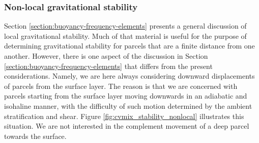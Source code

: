 \subsubsection{Non-local gravitational stability}

Section \ref{section:buoyancy-frequency-elements} presents a general
discussion of local gravitational stability.  Much of that material is
useful for the purpose of determining gravitational stability for
parcels that are a finite distance from one another.  However, there
is one aspect of the discussion in Section
\ref{section:buoyancy-frequency-elements} that differs from the
present considerations.  Namely, we are here always considering
downward displacements of parcels from the surface layer.  The reason
is that we are concerned with parcels starting from the surface layer
moving downwards in an adiabatic and isohaline manner, with the
difficulty of such motion determined by the ambient stratification and
shear.  Figure \ref{fig:cvmix_stability_nonlocal} illustrates this
situation.  We are not interested in the complement movement of a deep
parcel towards the surface.


